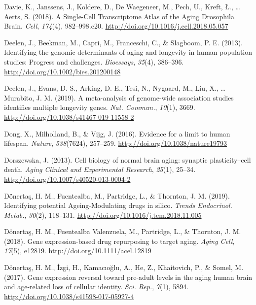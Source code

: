 \documentclass[12pt,twoside]{unicam}
\begin{document}
\begin{cslreferences}
\leavevmode\hypertarget{ref-Davie2018}{}%
Davie, K., Janssens, J., Koldere, D., De Waegeneer, M., Pech, U., Kreft, Ł., \ldots{} Aerts, S. (2018). A Single-Cell Transcriptome Atlas of the Aging Drosophila Brain. \emph{Cell}, \emph{174}(4), 982--998.e20. \url{http://doi.org/10.1016/j.cell.2018.05.057}

\leavevmode\hypertarget{ref-Deelen2013}{}%
Deelen, J., Beekman, M., Capri, M., Franceschi, C., \& Slagboom, P. E. (2013). Identifying the genomic determinants of aging and longevity in human population studies: Progress and challenges. \emph{Bioessays}, \emph{35}(4), 386--396. \url{http://doi.org/10.1002/bies.201200148}

\leavevmode\hypertarget{ref-Deelen2019}{}%
Deelen, J., Evans, D. S., Arking, D. E., Tesi, N., Nygaard, M., Liu, X., \ldots{} Murabito, J. M. (2019). A meta-analysis of genome-wide association studies identifies multiple longevity genes. \emph{Nat. Commun.}, \emph{10}(1), 3669. \url{http://doi.org/10.1038/s41467-019-11558-2}

\leavevmode\hypertarget{ref-Dong2016}{}%
Dong, X., Milholland, B., \& Vijg, J. (2016). Evidence for a limit to human lifespan. \emph{Nature}, \emph{538}(7624), 257--259. \url{http://doi.org/10.1038/nature19793}

\leavevmode\hypertarget{ref-Dorszewska2013}{}%
Dorszewska, J. (2013). Cell biology of normal brain aging: synaptic plasticity--cell death. \emph{Aging Clinical and Experimental Research}, \emph{25}(1), 25--34. \url{http://doi.org/10.1007/s40520-013-0004-2}

\leavevmode\hypertarget{ref-Donertas2019}{}%
Dönertaş, H. M., Fuentealba, M., Partridge, L., \& Thornton, J. M. (2019). Identifying potential Ageing-Modulating drugs in silico. \emph{Trends Endocrinol. Metab.}, \emph{30}(2), 118--131. \url{http://doi.org/10.1016/j.tem.2018.11.005}

\leavevmode\hypertarget{ref-Donertas2018}{}%
Dönertaş, H. M., Fuentealba Valenzuela, M., Partridge, L., \& Thornton, J. M. (2018). Gene expression-based drug repurposing to target aging. \emph{Aging Cell}, \emph{17}(5), e12819. \url{http://doi.org/10.1111/acel.12819}

\leavevmode\hypertarget{ref-Donertas2017}{}%
Dönertaş, H. M., İzgi, H., Kamacıoğlu, A., He, Z., Khaitovich, P., \& Somel, M. (2017). Gene expression reversal toward pre-adult levels in the aging human brain and age-related loss of cellular identity. \emph{Sci. Rep.}, \emph{7}(1), 5894. \url{http://doi.org/10.1038/s41598-017-05927-4}


\end{cslreferences}
\end{document}
